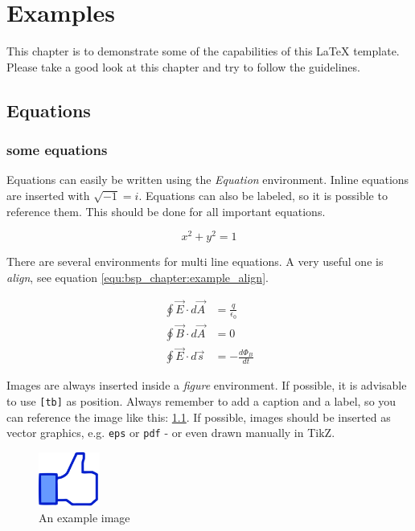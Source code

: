 
\chapter{Examples}

This chapter is to demonstrate some of the capabilities of this \LaTeX{} template.
Please take a good look at this chapter and try to follow the guidelines.\\

\section{Equations}
\subsection{some equations}
\glspl{Equation} can easily be written using the \emph{\gls{Equation}}
environment. Inline equations are inserted with $\sqrt{-1} = i $. Equations can
also be labeled, so it is possible to reference them. This should be done for
all important equations. 

\begin{equation}
	x^2 + y^2 = 1
	\label{equ:bsp_chapter:example_equation}
\end{equation}

There are several environments for multi line equations. A very useful one
is \emph{align}, see equation \ref{equ:bsp_chapter:example_align}.

\begin{align}
	\oint \vec{E} \cdot d \vec{A} &= \frac{q}{\epsilon_0} \\
	\oint \vec{B} \cdot d \vec{A} &= 0 \\
	\oint \vec{E} \cdot d \vec{s} &= - \frac{d \Phi_B}{dt}
	\label{equ:bsp_chapter:example_align}
\end{align}

Images are always inserted inside a \emph{figure}
environment. If possible, it is advisable to use \texttt{[tb]} as position.
Always remember to add a caption and a label, so you can reference the image
like this: \ref{fig:bsp_chapter:example_figure}. If possible, images should be
inserted as vector graphics, e.g. \texttt{eps} or \texttt{pdf} - or even drawn
manually in TikZ. \\ 

\begin{figure}[t]
	\centering
	\includegraphics[width=2cm]{chapters/bsp_chapter/images/thumbs_up.jpg}
	\caption{An example image}
	\label{fig:bsp_chapter:example_figure}
\end{figure}

